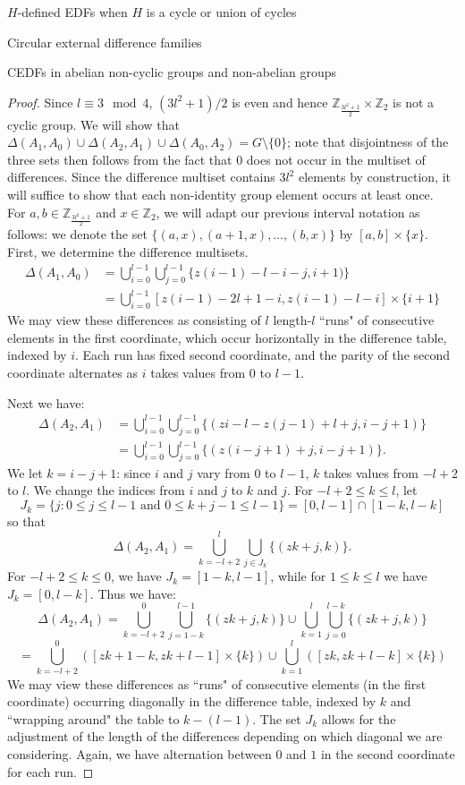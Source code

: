 \documentclass[12pt, a4paper]{article}
\theoremstyle{definition}
\begin{document}
\begin{section}{$H$-defined EDFs when $H$ is a cycle or union of cycles}
\begin{subsection}{Circular external difference families}
\begin{subsection}{CEDFs in abelian non-cyclic groups and non-abelian groups}
\begin{proof}
Since $l \equiv 3 \mod 4$, $(3l^2+1)/2$ is even and hence $\mathbb{Z}_{\frac{3l^2+1}{2}}\times\mathbb{Z}_2$ is not a cyclic group.  We will show that $\Delta(A_1,A_0) \cup \Delta(A_2,A_1) \cup \Delta(A_0,A_2)=G \setminus \{0\}$; note that disjointness of the three sets then follows from the fact that $0$ does not occur in the multiset of differences.  Since the difference multiset contains $3l^2$ elements by construction, it will suffice to show that each non-identity group element occurs at least once.\\
For $a, b \in \mathbb{Z}_{\frac{3l^2+1}{2}}$ and $x \in \mathbb{Z}_2$, we will adapt our previous interval notation as follows: we denote the set $\{(a,x), (a+1,x), \ldots, (b,x)\}$ by $[a,b]\times \{x\}$. \\
First, we determine the difference multisets. 
\begin{align*}
\Delta  (A_1,A_0) &= \bigcup_{i=0}^{l-1}\bigcup_{j=0}^{l-1}\{z(i-1)-l-i-j,i+1)\}\\
&= \bigcup_{i=0}^{l-1}[z(i-1)-2l+1-i,z(i-1)-l-i]\times\{i+1\}
\end{align*}
We may view these differences as consisting of $l$ length-$l$ ``runs" of consecutive elements in the first coordinate, which occur horizontally in the difference table, indexed by $i$. Each run has fixed second coordinate, and the parity of the second coordinate alternates as $i$ takes values from $0$ to $l-1$.

Next we have:
\begin{align*}
\Delta  (A_2,A_1) &= \bigcup_{i=0}^{l-1}\bigcup_{j=0}^{l-1}\{(zi-l-z(j-1)+l+j,i-j+1)\}\\
&= \bigcup_{i=0}^{l-1}\bigcup_{j=0}^{l-1}\{(z(i-j+1)+j,i-j+1)\}.
\end{align*}
We let $k = i-j+1$: since $i$ and $j$ vary from $0$ to $l-1$, $k$ takes values from  $-l+2$ to $l$.  We change the indices from $i$ and $j$ to $k$ and $j$.  For $-l+2 \leq k \leq l$, let  $$J_k=\{j: 0 \leq j \leq l-1 \mbox{ and } 0 \leq k+j-1 \leq l-1\}=[0,l-1] \cap [1-k,l-k]$$
so that
$$\Delta  (A_2,A_1) = \bigcup_{k=-l+2}^{l}\bigcup_{j \in J_k} \{(z k+j,k)\}.$$
For $-l+2 \leq k \leq 0$, we have $J_k=[1-k,l-1]$, while for $1 \leq k \leq l$ we have $J_k=[0,l-k].$  Thus we have:
\[\Delta  (A_2,A_1) 
= \bigcup_{k=-l+2}^{0}\bigcup_{j=1-k}^{l-1}\{(zk+j,k)\}\cup\bigcup_{k=1}^{l}\bigcup_{j=0}^{l-k}\{(zk+j,k)\}\]
\[= \bigcup_{k=-l+2}^{0}\left([zk+1-k,zk+l-1]\times\{k\}\right)\cup\bigcup_{k=1}^{l}\left([zk,zk+l-k]\times\{k\}\right)\]
We may view these differences as ``runs" of consecutive elements (in the first coordinate) occurring diagonally in the difference table, indexed by $k$ and ``wrapping around" the table to $k-(l-1)$. The set $J_k$ allows for the adjustment of the length of the differences depending on which diagonal we are considering. Again, we have alternation between $0$ and $1$ in the second coordinate for each run.


\end{proof}
\end{subsection}
\end{subsection}
\end{section}
\end{document}
